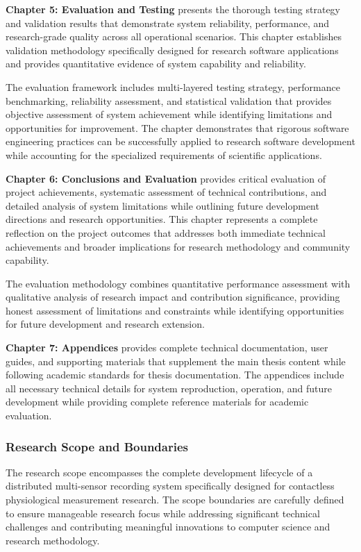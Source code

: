 \documentclass[11pt,a4paper]{article}
\begin{document}
\textbf{Chapter 5: Evaluation and Testing} presents the thorough testing strategy and validation results that
demonstrate system reliability, performance, and research-grade quality across
all operational scenarios. This chapter
establishes validation methodology specifically designed for research software
applications and provides quantitative
evidence of system capability and reliability.

The evaluation framework includes multi-layered testing strategy, performance
benchmarking, reliability assessment, and
statistical validation that provides objective assessment of system achievement
while identifying limitations and
opportunities for improvement. The chapter demonstrates that rigorous software
engineering practices can be successfully
applied to research software development while accounting for the specialized
requirements of scientific applications.

\textbf{Chapter 6: Conclusions and Evaluation} provides critical evaluation of project achievements, systematic assessment of
technical contributions, and detailed analysis of system limitations while
outlining future development directions
and research opportunities. This chapter represents a complete reflection on the
project outcomes that addresses
both immediate technical achievements and broader implications for research
methodology and community capability.

The evaluation methodology combines quantitative performance assessment with
qualitative analysis of research impact and
contribution significance, providing honest assessment of limitations and
constraints while identifying opportunities
for future development and research extension.

\textbf{Chapter 7: Appendices} provides complete technical documentation, user guides, and supporting materials that
supplement the main thesis content while following academic standards for thesis
documentation. The appendices include
all necessary technical details for system reproduction, operation, and future
development while providing complete
reference materials for academic evaluation.

\subsubsection{Research Scope and Boundaries}

The research scope encompasses the complete development lifecycle of a
distributed multi-sensor recording system
specifically designed for contactless physiological measurement research. The
scope boundaries are carefully defined to
ensure manageable research focus while addressing significant technical
challenges and contributing meaningful
innovations to computer science and research methodology.
\end{document}
